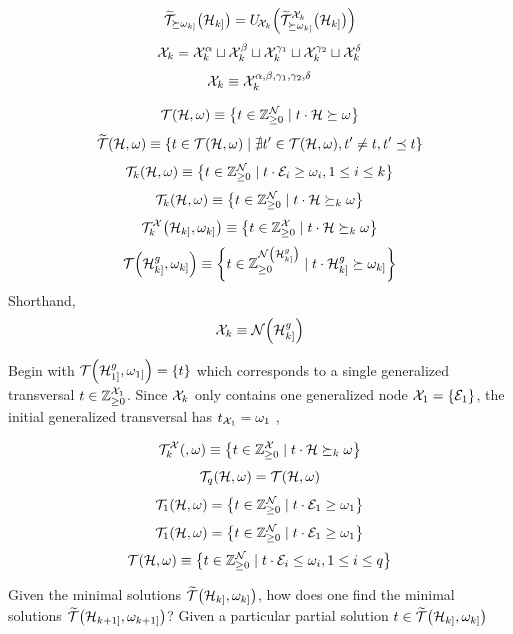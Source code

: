 \documentclass[aps, 10pt, english, twoside, twocolumn, pra, nofootinbib, tightenlines, longbibliography, superscriptaddress]{revtex4-1}
\begin{document}
    \[ \widetilde {\s T}_{\succeq \w_{k]}}\br{\s H_{k]}} = U_{\!\s X_{k}}\br{\widetilde {\s T}_{\succeq \w_{k]}}^{\s X_{k}}\br{\s H_{k]}}} \]
    \[ \mathcal{X}_{k} = \mathcal{X}_{k}^{\alpha} \sqcup \mathcal{X}_{k}^{\beta} \sqcup \mathcal{X}_{k}^{\gamma_1} \sqcup \mathcal{X}_{k}^{\gamma_2} \sqcup \mathcal{X}_{k}^{\delta} \]
    \[ \mathcal{X}_{k} \equiv \mathcal{X}_{k}^{\alpha,\beta,\gamma_1,\gamma_2,\delta} \]
    \begin{definition}
        \[ \s T\br{\s H, \w} \defined \bc{t \in \Z_{\geq 0}^{\nodes} \mid t \cdot \s H \succeq \w} \]
        \[ \widetilde {\s T}\br{\s H, \w} \defined \bc{t \in \s T\br{\s H, \w} \mid \nexists t' \in \s T\br{\s H, \w}, t' \neq t, t' \preceq t} \]
        \[ \s T_{k}\br{\s H, \w} \defined \bc{t \in \Z_{\geq 0}^{\nodes} \mid t \cdot \edges_i \geq \w_i, 1 \leq i \leq k} \]
        \[ \s T_{k}\br{\s H, \w} \defined \bc{t \in \Z_{\geq 0}^{\nodes} \mid t \cdot \s H \succeq_{k} \w} \]
        \[ \s T_{k}^{\s X}\br{\s H_{k]}, \w_{k]}} \defined \bc{t \in \Z_{\geq 0}^{\s X} \mid t \cdot \s H \succeq_{k} \w} \]
        \[ \s T\br{\s H^{g}_{k]}, \w_{k]}} \defined \bc{t \in \Z_{\geq 0}^{\nodes\br{\s H_{k]}^{g}}} \mid t \cdot \s H^{g}_{k]} \succeq \w_{k]}} \]
        Shorthand,
        \[ \s X_k \defined \nodes\br{\s H_{k]}^{g}} \]

        Begin with $\s T\br{\s H^{g}_{1]}, \w_{1]}} = \bc{t}$ which corresponds to a single generalized transversal $t \in {\mathbb{Z}}_{\geq 0}^{\mathcal{X}_1}$. Since $\mathcal{X}_k$ only contains one generalized node $\s X_1 = \bc{\edges_1}$, the initial generalized transversal has $t_{\mathcal{X}_1} = \omega_1$ ,
        \[  \]

        \[ \s T_{k}^{\s X}\br{, \w} \defined \bc{t \in \Z_{\geq 0}^{\s X} \mid t \cdot \s H \succeq_{k} \w} \]
        \[ \s T_{q}\br{\s H, \w} = \s T\br{\s H, \w} \]
        \[ \s T_{1}\br{\s H, \w} = \bc{t \in \Z_{\geq 0}^{\nodes} \mid t \cdot \edges_1 \geq \w_1} \]
        \[ \s T_{1}\br{\s H, \w} = \bc{t \in \Z_{\geq 0}^{\nodes} \mid t \cdot \edges_1 \geq \w_1} \]
        \[ \s T\br{\s H, \w} \defined \bc{t \in \Z_{\geq 0}^{\nodes} \mid t \cdot \edges_i \leq \w_i, 1 \leq i \leq q} \]
    \end{definition}

    Given the minimal solutions $\widetilde {\s T}\br{\s H_{k]}, \w_{k]}}$, how does one find the minimal solutions $\widetilde {\s T}\br{\s H_{k+1]}, \w_{k+1]}}$? Given a particular partial solution $t \in \widetilde {\s T}\br{\s H_{k]}, \w_{k]}}$
\end{document}

